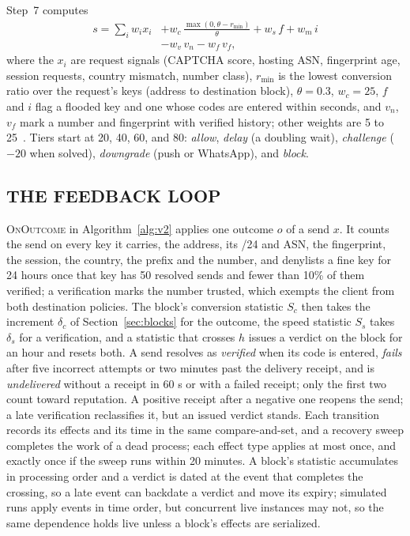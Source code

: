 \documentclass{IEEEoj}
\begin{document}
Step~7 computes
\begin{equation}
\begin{split}
s = \sum_i w_i x_i &+ w_c\,\frac{\max(0,\theta - r_{\min})}{\theta} + w_s\,f + w_m\,i \\
 &- w_v\,v_n - w_f\,v_f,
\end{split}
\label{eq:score}
\end{equation}
where the $x_i$ are request signals (CAPTCHA score, hosting ASN, fingerprint age, session requests, country mismatch, number class), $r_{\min}$ is the lowest conversion ratio over the request's keys (address to destination block), $\theta=0.3$, $w_c=25$, $f$ and $i$ flag a flooded key and one whose codes are entered within seconds, and $v_n$, $v_f$ mark a number and fingerprint with verified history; other weights are 5 to 25~\cite{otpguard2026}. Tiers start at 20, 40, 60, and 80: \emph{allow}, \emph{delay} (a doubling wait), \emph{challenge} ($-20$ when solved), \emph{downgrade} (push or WhatsApp), and \emph{block}.

\subsection{THE FEEDBACK LOOP}
\label{sec:feedback}

\textsc{OnOutcome} in Algorithm~\ref{alg:v2} applies one outcome $o$ of a send $x$. It counts the send on every key it carries, the address, its /24 and ASN, the fingerprint, the session, the country, the prefix and the number, and denylists a fine key for 24 hours once that key has 50 resolved sends and fewer than 10\% of them verified; a verification marks the number trusted, which exempts the client from both destination policies. The block's conversion statistic $S_c$ then takes the increment $\delta_c$ of Section~\ref{sec:blocks} for the outcome, the speed statistic $S_s$ takes $\delta_s$ for a verification, and a statistic that crosses $h$ issues a verdict on the block for an hour and resets both. A send resolves as \emph{verified} when its code is entered, \emph{fails} after five incorrect attempts or two minutes past the delivery receipt, and is \emph{undelivered} without a receipt in 60 s or with a failed receipt; only the first two count toward reputation. A positive receipt after a negative one reopens the send; a late verification reclassifies it, but an issued verdict stands. Each transition records its effects and its time in the same compare-and-set, and a recovery sweep completes the work of a dead process; each effect type applies at most once, and exactly once if the sweep runs within 20 minutes. A block's statistic accumulates in processing order and a verdict is dated at the event that completes the crossing, so a late event can backdate a verdict and move its expiry; simulated runs apply events in time order, but concurrent live instances may not, so the same dependence holds live unless a block's effects are serialized.
\end{document}
